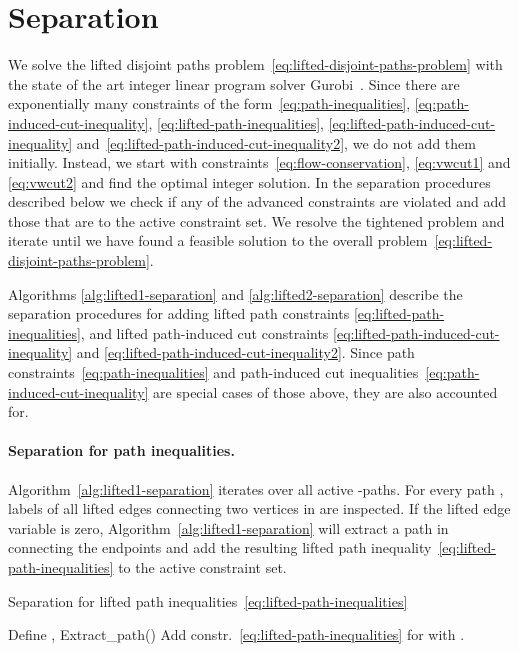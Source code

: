 \documentclass{article}
\begin{document}
  \section{Separation}
\label{sec:separation}
We solve the lifted disjoint paths problem~\eqref{eq:lifted-disjoint-paths-problem} with the state of the art integer linear program solver Gurobi~\cite{gurobi}.
Since there are exponentially many constraints of the form~\eqref{eq:path-inequalities}, \eqref{eq:path-induced-cut-inequality}, \eqref{eq:lifted-path-inequalities}, \eqref{eq:lifted-path-induced-cut-inequality} and~\eqref{eq:lifted-path-induced-cut-inequality2}, we do not add them initially.
Instead, we start with constraints~\eqref{eq:flow-conservation}, \eqref{eq:vwcut1} and \eqref{eq:vwcut2} and find the optimal integer solution.
In the separation procedures described below we check if any of the advanced constraints are violated and add those that are to the active constraint set.
We resolve the tightened problem and iterate until we have found a feasible solution to the overall problem~\eqref{eq:lifted-disjoint-paths-problem}.

Algorithms \ref{alg:lifted1-separation} and \ref{alg:lifted2-separation} describe the separation procedures for adding lifted path constraints \eqref{eq:lifted-path-inequalities}, and lifted path-induced cut constraints \eqref{eq:lifted-path-induced-cut-inequality} and \eqref{eq:lifted-path-induced-cut-inequality2}.
Since path constraints~\eqref{eq:path-inequalities} and path-induced cut inequalities~\eqref{eq:path-induced-cut-inequality} are special cases of those above, they are also accounted for.

\paragraph{Separation for path inequalities.}
Algorithm~\ref{alg:lifted1-separation} iterates over all active -paths.
For every path , labels of all lifted edges connecting two vertices in  are inspected.
If the lifted edge variable is zero, Algorithm~\ref{alg:lifted1-separation} will extract a path in  connecting the endpoints and add the resulting lifted path inequality~\eqref{eq:lifted-path-inequalities} to the active constraint set.
\begin{algorithm}[!ht]
    \caption{Separation for lifted path inequalities~\eqref{eq:lifted-path-inequalities}}
    \label{alg:lifted1-separation}
    \begin{algorithmic}\STATE Define , 
          \FORALL{}          
          \STATE  \textrm{Extract\_path()}
          \STATE Add constr.~\eqref{eq:lifted-path-inequalities} for  with  .
         \ENDFOR
        \ENDFOR
    \end{algorithmic}
\end{algorithm}
\end{document}
